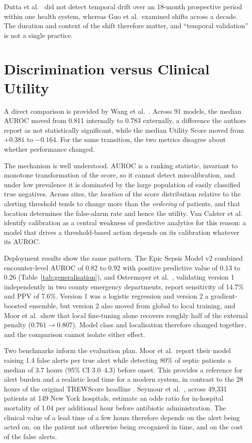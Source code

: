 Dutta et al.\ \cite{dutta2026performance} did not detect temporal drift over
an 18-month prospective period within one health system, whereas Guo et al.\
examined shifts across a decade. The duration and context of the shift
therefore matter, and ``temporal validation'' is not a single practice.


\section{Discrimination versus Clinical Utility}
\label{sec:auroc_illusion}

A direct comparison is provided by Wang et al.\ \cite{wang2025srpm}. Across 91
models, the median AUROC moved from 0.811 internally to 0.783 externally, a
difference the authors report as not statistically significant, while the
median Utility Score moved from $+0.381$ to $-0.164$. For the same transition,
the two metrics disagree about whether performance changed.

The mechanism is well understood. AUROC is a ranking statistic, invariant to
monotone transformation of the score, so it cannot detect miscalibration, and
under low prevalence it is dominated by the large population of easily
classified true negatives. Across sites, the \emph{location} of the score
distribution relative to the alerting threshold tends to change more than the
\emph{ordering} of patients, and that location determines the false-alarm rate
and hence the utility. Van Calster et al.\ \cite{vancalster2019calibration}
identify calibration as a central weakness of predictive analytics for this
reason: a model that drives a threshold-based action depends on its
calibration whatever its AUROC.

Deployment results show the same pattern. The Epic Sepsis Model v2 combined
encounter-level AUROC of 0.82 to 0.92 with positive predictive value of 0.13 to
0.26 \cite{wong2026epic} (Table~\ref{tab:generalisation}), and Ostermayer et
al.\ \cite{ostermayer2024external}, validating version 1 independently in two
county emergency departments, report sensitivity of 14.7\% and PPV of 7.6\%.
Version 1 was a logistic regression and version 2 a gradient-boosted ensemble,
but version 2 also moved from global to local training, and Moor et al.\ show
that local fine-tuning alone recovers roughly half of the external penalty
($0.761 \rightarrow 0.807$). Model class and localisation therefore changed
together, and the comparison cannot isolate either effect.

Two benchmarks inform the evaluation plan. Moor et al.\ report their model
raising 1.4 false alerts per true alert while detecting 80\% of septic
patients a median of 3.7 hours (95\% CI 3.0--4.3) before onset. This provides a
reference for alert burden and a realistic lead time for a modern system, in
contrast to the 28 hours of the original TREWScore headline
\cite{henry2015trewscore}. Seymour et al.\ \cite{seymour2017time}, across
49,331 patients at 149 New York hospitals, estimate an odds ratio for
in-hospital mortality of 1.04 per additional hour before antibiotic
administration. The clinical value of a lead time of a few hours therefore
depends on the alert being acted on, on the patient not otherwise being
recognised in time, and on the cost of the false alerts.

